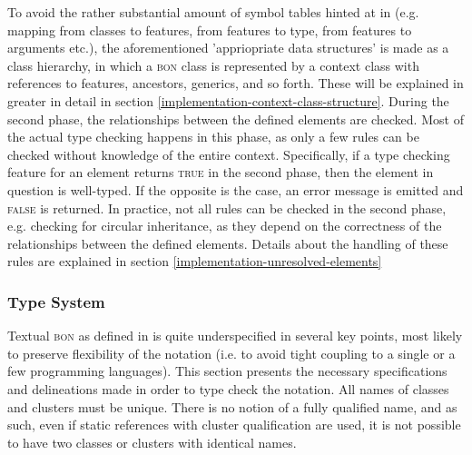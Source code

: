 To avoid the rather substantial amount of symbol tables hinted at in \cite{appel2004} (e.g. mapping from classes to features, from features to type, from features to arguments etc.), the aforementioned 'appriopriate data structures' is made as a class hierarchy, in which a \textsc{bon} class is represented by a context class with references to features, ancestors, generics, and so forth. These will be explained in greater in detail in section \ref{implementation-context-class-structure}.
During the second phase, the relationships between the defined elements are checked. Most of the actual type checking happens in this phase, as only a few rules can be checked without knowledge of the entire context. Specifically, if a type checking feature for an element returns \textsc{true} in the second phase, then the element in question is well-typed. If the opposite is the case, an error message is emitted and \textsc{false} is returned. In practice, not all rules can be checked in the second phase, e.g. checking for circular inheritance, as they depend on the correctness of the relationships between the defined elements. Details about the handling of these rules are explained in section \ref{implementation-unresolved-elements}

\subsubsection {Type System}
\label{design-type-system}
Textual \textsc{bon} as defined in \cite{walden1995} is quite underspecified in several key points, most likely to preserve flexibility of the notation (i.e. to avoid tight coupling to a single or a few programming languages). This section presents the necessary specifications and delineations made in order to type check the notation.
\label{design-type-names}
All names of classes and clusters must be unique. There is no notion of a fully qualified name, and as such, even if static references with cluster qualification are used, it is not possible to have two classes or clusters with identical names.


